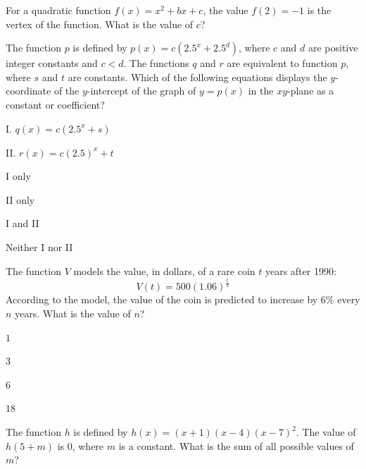 \vfill
\clearpage
\noindent\begin{minipage}{\linewidth}
\par\smallskip
For a quadratic function $f(x)=x^2+bx+c$, the value $f(2)=-1$ is the vertex of the function. What is the value of $c$?
\end{minipage}
\vfill
\noindent\begin{minipage}{\linewidth}
\par\smallskip
The function $p$ is defined by $p(x)=c\left(2.5^x+2.5^d\right)$, where $c$ and $d$ are positive integer constants and $c<d$. The functions $q$ and $r$ are equivalent to function $p$, where $s$ and $t$ are constants. Which of the following equations displays the $y$-coordinate of the $y$-intercept of the graph of $y=p(x)$ in the $xy$-plane as a constant or coefficient?\par\smallskip I. $q(x)=c\left(2.5^x+s\right)$\par II. $r(x)=c\left(2.5\right)^x+t$
\begin{satchoices}
  \item[A)] I only
  \item[B)] II only
  \item[C)] I and II
  \item[D)] Neither I nor II
\end{satchoices}
\end{minipage}
\vfill
\noindent\begin{minipage}{\linewidth}
\par\smallskip
The function $V$ models the value, in dollars, of a rare coin $t$ years after 1990: $$V(t)=500(1.06)^{\frac{t}{3}}$$ According to the model, the value of the coin is predicted to increase by $6\%$ every $n$ years. What is the value of $n$?
\begin{satchoices}
  \item[A)] $1$
  \item[B)] $3$
  \item[C)] $6$
  \item[D)] $18$
\end{satchoices}
\end{minipage}
\vfill
\clearpage
\noindent\begin{minipage}{\linewidth}
\par\smallskip
The function $h$ is defined by $h(x)=(x+1)(x-4)(x-7)^2$. The value of $h(5+m)$ is 0, where $m$ is a constant. What is the sum of all possible values of $m$?
\end{minipage}
